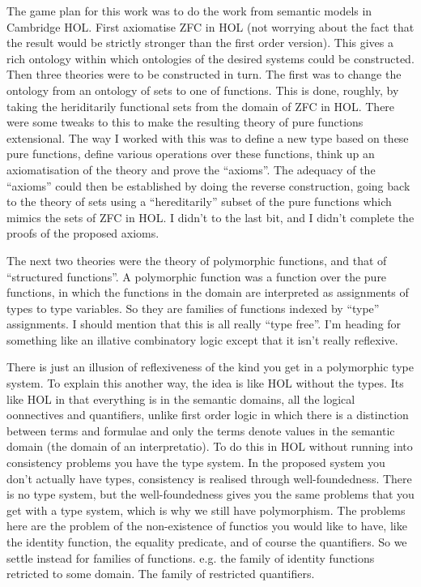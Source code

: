 \documentclass[10pt,titlepage]{book}
\begin{document}
The game plan for this work was to do the work from semantic models in Cambridge HOL.
First axiomatise ZFC in HOL (not worrying about the fact that the result would be strictly stronger than the first order version).
This gives a rich ontology within which ontologies of the desired systems could be constructed.
Then three theories were to be constructed in turn.
The first was to change the ontology from an ontology of sets to one of functions.
This is done, roughly, by taking the heriditarily functional sets from the domain of ZFC in HOL.
There were some tweaks to this to make the resulting theory of pure functions extensional.
The way I worked with this was to define a new type based on these pure functions, define various operations over these functions, think up an axiomatisation of the theory and prove the ``axioms''.
The adequacy of the ``axioms'' could then be established by doing the reverse construction, going back to the theory of sets using a ``hereditarily'' subset of the pure functions which mimics the sets of ZFC in HOL.
I didn't to the last bit, and I didn't complete the proofs of the proposed axioms.

The next two theories were the theory of polymorphic functions, and that of ``structured functions''.
A polymorphic function was a function over the pure functions, in which the functions in the domain are interpreted as assignments of types to type variables.
So they are families of functions indexed by ``type'' assignments.
I should mention that this is all really ``type free''.
I'm heading for something like an illative combinatory logic except that it isn't really reflexive.

There is just an illusion of reflexiveness of the kind you get in a polymorphic type system.
To explain this another way, the idea is like HOL without the types.
Its like HOL in that everything is in the semantic domains, all the logical oonnectives and quantifiers, unlike first order logic in which there is a distinction between terms and formulae and only the terms denote values in the semantic domain (the domain of an interpretatio).
To do this in HOL without running into consistency problems you have the type system.
In the proposed system you don't actually have types, consistency is realised through well-foundedness.
There is no type system, but the well-foundedness gives you the same problems that you get with a type system, which is why we still have polymorphism.
The problems here are the problem of the non-existence of functios you would like to have, like the identity function, the equality predicate, and of course the quantifiers.
So we settle instead for families of functions.
e.g. the family of identity functions retricted to some domain.
The family of restricted quantifiers.
\end{document}
